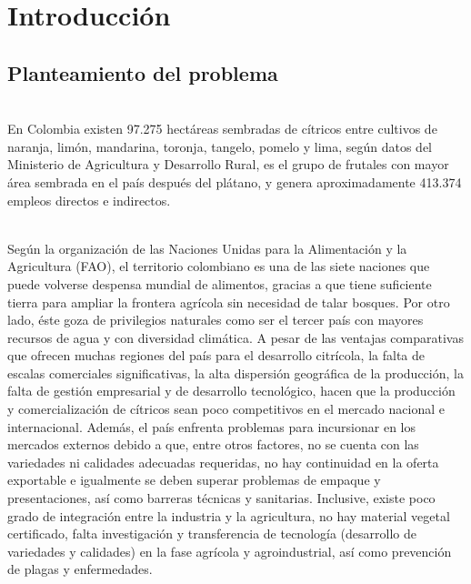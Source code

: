\chapter{Introducci\'{o}n}

\section{Planteamiento del problema}
~\\En Colombia existen 97.275 hect\'{a}reas sembradas de c\'{i}tricos entre cultivos de naranja, lim\'{o}n, mandarina, toronja, tangelo, pomelo y lima, seg\'{u}n datos del Ministerio de Agricultura y Desarrollo Rural, es el grupo de frutales con mayor \'{a}rea sembrada en el pa\'{i}s despu\'{e}s del pl\'{a}tano, y genera aproximadamente 413.374 empleos directos e indirectos.

~\\Seg\'{u}n la organizaci\'{o}n de las Naciones Unidas para la Alimentaci\'{o}n y la Agricultura (FAO), el territorio colombiano es una de las siete naciones que puede volverse despensa mundial de alimentos, gracias a que tiene suficiente tierra para ampliar la frontera agr\'{i}cola sin necesidad de talar bosques. Por otro lado, \'{e}ste goza de privilegios naturales como ser el tercer pa\'{i}s con mayores recursos de agua y con diversidad clim\'{a}tica. A pesar de las ventajas comparativas que ofrecen muchas regiones del pa\'{i}s para el desarrollo citr\'{i}cola, la falta de escalas comerciales significativas, la alta dispersi\'{o}n geogr\'{a}fica de la producci\'{o}n, la falta de gesti\'{o}n empresarial y de desarrollo tecnol\'{o}gico, hacen que la producci\'{o}n y comercializaci\'{o}n de c\'{i}tricos sean poco competitivos en el mercado nacional e internacional. Adem\'{a}s, el pa\'{i}s enfrenta problemas para incursionar en los mercados externos debido a que, entre otros factores, no se cuenta con las variedades ni calidades adecuadas requeridas, no hay continuidad en la oferta exportable e igualmente se deben superar problemas de empaque y presentaciones, as\'{i} como barreras t\'{e}cnicas y sanitarias. Inclusive, existe poco grado de integraci\'{o}n entre la industria y la agricultura, no hay material vegetal certificado, falta investigaci\'{o}n y transferencia de tecnolog\'{i}a (desarrollo de variedades y calidades) en la fase agr\'{i}cola y agroindustrial, as\'{i} como prevenci\'{o}n de plagas y enfermedades.

